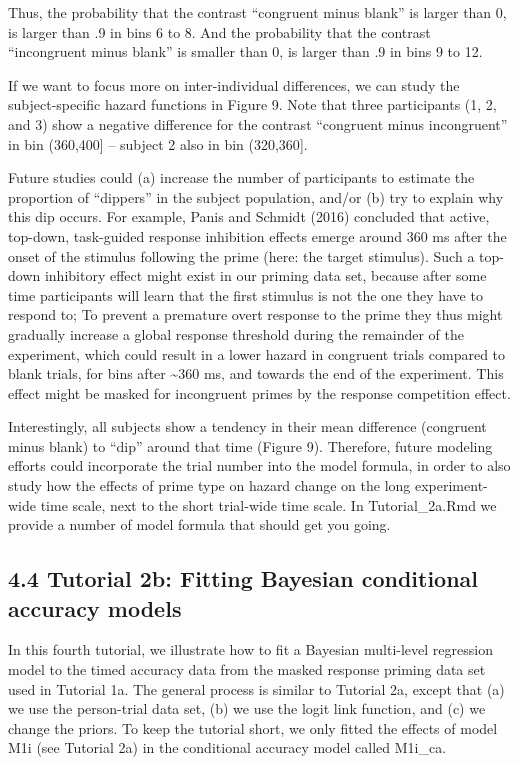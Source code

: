 \documentclass[
  man, donotrepeattitle,floatsintext]{apa6}
\begin{document}
Thus, the probability that the contrast ``congruent minus blank'' is larger than 0, is larger than .9 in bins 6 to 8. And the probability that the contrast ``incongruent minus blank'' is smaller than 0, is larger than .9 in bins 9 to 12.

If we want to focus more on inter-individual differences, we can study the subject-specific hazard functions in Figure 9. Note that three participants (1, 2, and 3) show a negative difference for the contrast ``congruent minus incongruent'' in bin (360,400{]} -- subject 2 also in bin (320,360{]}.

Future studies could (a) increase the number of participants to estimate the proportion of ``dippers'' in the subject population, and/or (b) try to explain why this dip occurs. For example, Panis and Schmidt (2016) concluded that active, top-down, task-guided response inhibition effects emerge around 360 ms after the onset of the stimulus following the prime (here: the target stimulus). Such a top-down inhibitory effect might exist in our priming data set, because after some time participants will learn that the first stimulus is not the one they have to respond to; To prevent a premature overt response to the prime they thus might gradually increase a global response threshold during the remainder of the experiment, which could result in a lower hazard in congruent trials compared to blank trials, for bins after \textasciitilde360 ms, and towards the end of the experiment. This effect might be masked for incongruent primes by the response competition effect.

Interestingly, all subjects show a tendency in their mean difference (congruent minus blank) to ``dip'' around that time (Figure 9). Therefore, future modeling efforts could incorporate the trial number into the model formula, in order to also study how the effects of prime type on hazard change on the long experiment-wide time scale, next to the short trial-wide time scale. In Tutorial\_2a.Rmd we provide a number of model formula that should get you going.

\subsection{4.4 Tutorial 2b: Fitting Bayesian conditional accuracy models}\label{tutorial-2b-fitting-bayesian-conditional-accuracy-models}

In this fourth tutorial, we illustrate how to fit a Bayesian multi-level regression model to the timed accuracy data from the masked response priming data set used in Tutorial 1a. The general process is similar to Tutorial 2a, except that (a) we use the person-trial data set, (b) we use the logit link function, and (c) we change the priors. To keep the tutorial short, we only fitted the effects of model M1i (see Tutorial 2a) in the conditional accuracy model called M1i\_ca.
\end{document}
